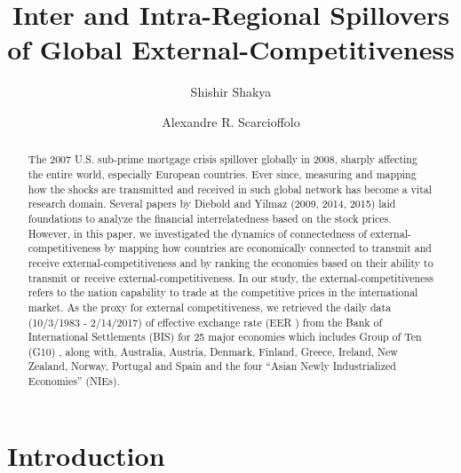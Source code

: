 \documentclass[]{elsarticle} %
\begin{document}
\begin{frontmatter}

  \title{Inter and Intra-Regional Spillovers of Global External-Competitiveness}
    \author[West Virginia University]{Shishir Shakya}
    \author[West Virginia University]{Alexandre R. Scarcioffolo}
  
      \address[West Virginia University]{College of Business and Economics \& Regional Research Institute (RRI),
West Virginia University}
    \address[Another University]{Davis College of Agriculture, Natural Resources and Design \& Regional
Research Institute (RRI), West Virginia University}
  
  \begin{abstract}
  The 2007 U.S. sub-prime mortgage crisis spillover globally in 2008,
  sharply affecting the entire world, especially European countries. Ever
  since, measuring and mapping how the shocks are transmitted and received
  in such global network has become a vital research domain. Several
  papers by Diebold and Yilmaz (2009, 2014, 2015) laid foundations to
  analyze the financial interrelatedness based on the stock prices.
  However, in this paper, we investigated the dynamics of connectedness of
  external-competitiveness by mapping how countries are economically
  connected to transmit and receive external-competitiveness and by
  ranking the economies based on their ability to transmit or receive
  external-competitiveness. In our study, the external-competitiveness
  refers to the nation capability to trade at the competitive prices in
  the international market. As the proxy for external competitiveness, we
  retrieved the daily data (10/3/1983 - 2/14/2017) of effective exchange
  rate (EER ) from the Bank of International Settlements (BIS) for 25
  major economies which includes Group of Ten (G10) , along with,
  Australia, Austria, Denmark, Finland, Greece, Ireland, New Zealand,
  Norway, Portugal and Spain and the four ``Asian Newly Industrialized
  Economies'' (NIEs).
  \end{abstract}
  
 \end{frontmatter}

\section{Introduction}\label{introduction}
\end{document}
